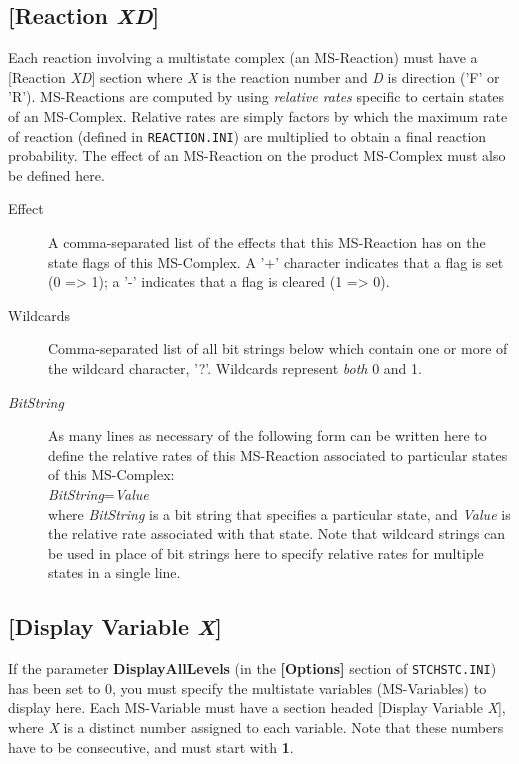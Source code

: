 \subsection{[Reaction \emph{XD}]}
Each reaction involving a multistate complex (an MS-Reaction) must
have a [Reaction \emph{XD}] section where \emph{X} is the reaction
number and \emph{D} is direction ('F' or 'R').  MS-Reactions are
computed by using \emph{relative rates} specific to certain states of
an MS-Complex.  Relative rates are simply factors by which the maximum
rate of reaction (defined in \texttt{REACTION.INI}) are multiplied to obtain a
final reaction probability.  The effect of an MS-Reaction on the
product MS-Complex must also be defined here.
\begin{description}
\item[Effect] A comma-separated list of the effects that this
  MS-Reaction has on the state flags of this MS-Complex.  A '+'
  character indicates that a flag is set (0 => 1); a '-' indicates
  that a flag is cleared (1 => 0).
  
\item[Wildcards] Comma-separated list of all bit strings below which
  contain one or more of the wildcard character, '?'. Wildcards represent \emph{both} 0 and 1.
\item[\emph{BitString}] As many lines as necessary of the following
  form can be written here to define the relative rates of this
  MS-Reaction associated to particular states of this
  MS-Complex:\\[\baselineskip]
  \emph{BitString}=\emph{Value}
  \\[\baselineskip]
  where \emph{BitString} is a bit string that specifies a particular
  state, and \emph{Value} is the relative rate associated with that
  state.  Note that wildcard strings can be used in place of bit
  strings here to specify relative rates for multiple states in a
  single line.

\end{description}

\subsection{[Display Variable \emph{X}]}\label{ms_variables}
If the parameter \textbf{DisplayAllLevels} (in the \textbf{[Options]}
section of \texttt{STCHSTC.INI}) has been set to 0, you must specify the
multistate variables (MS-Variables) to display here.  Each MS-Variable
must have a section headed [Display Variable \emph{X}], where \emph{X}
is a distinct number assigned to each variable.  Note that these
numbers have to be consecutive, and must start with \textbf{1}.


